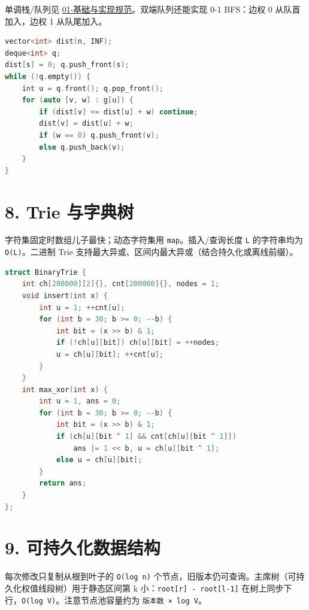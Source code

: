 单调栈/队列见 \href{01-基础与实现规范.md}{01-基础与实现规范}。双端队列还能实现 0-1 BFS：边权 0 从队首加入，边权 1 从队尾加入。

\begin{lstlisting}[language={C++}]
vector<int> dist(n, INF);
deque<int> q;
dist[s] = 0; q.push_front(s);
while (!q.empty()) {
    int u = q.front(); q.pop_front();
    for (auto [v, w] : g[u]) {
        if (dist[v] <= dist[u] + w) continue;
        dist[v] = dist[u] + w;
        if (w == 0) q.push_front(v);
        else q.push_back(v);
    }
}
\end{lstlisting}

\section{8. Trie 与字典树}\label{trie-ux4e0eux5b57ux5178ux6811}

字符集固定时数组儿子最快；动态字符集用 \passthrough{\lstinline!map!}。插入/查询长度 \passthrough{\lstinline!L!} 的字符串均为 \passthrough{\lstinline!O(L)!}。二进制 Trie 支持最大异或、区间内最大异或（结合持久化或离线前缀）。

\begin{lstlisting}[language={C++}]
struct BinaryTrie {
    int ch[200000][2]{}, cnt[200000]{}, nodes = 1;
    void insert(int x) {
        int u = 1; ++cnt[u];
        for (int b = 30; b >= 0; --b) {
            int bit = (x >> b) & 1;
            if (!ch[u][bit]) ch[u][bit] = ++nodes;
            u = ch[u][bit]; ++cnt[u];
        }
    }
    int max_xor(int x) {
        int u = 1, ans = 0;
        for (int b = 30; b >= 0; --b) {
            int bit = (x >> b) & 1;
            if (ch[u][bit ^ 1] && cnt[ch[u][bit ^ 1]])
                ans |= 1 << b, u = ch[u][bit ^ 1];
            else u = ch[u][bit];
        }
        return ans;
    }
};
\end{lstlisting}

\section{9. 可持久化数据结构}\label{ux53efux6301ux4e45ux5316ux6570ux636eux7ed3ux6784}

每次修改只复制从根到叶子的 \passthrough{\lstinline!O(log n)!} 个节点，旧版本仍可查询。主席树（可持久化权值线段树）用于静态区间第 k 小：\passthrough{\lstinline!root[r] - root[l-1]!} 在树上同步下行，\passthrough{\lstinline!O(log V)!}。注意节点池容量约为 \passthrough{\lstinline!版本数 × log V!}。

